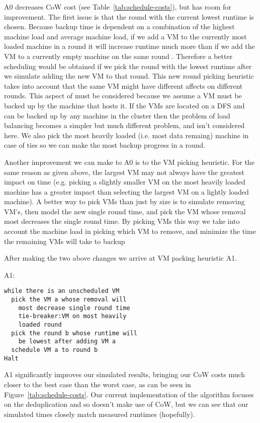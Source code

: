 A0 decreases CoW cost (see Table~\ref{tab:schedule-costs}), but has room for
improvement. The first issue is that the round with the current lowest runtime
is chosen.  Because backup time is dependent on a combination of the highest
machine load and average machine load, if we add a VM to the currently most
loaded machine in a round it will increase runtime much more than if we add the
VM to a currently empty machine on the same round
. Therefore a better scheduling
would be obtained if we pick the round with the lowest runtime after we
simulate adding the new VM to that round. This new round picking heuristic
takes into account that the same VM might have different affects on different
rounds. This aspect of must be considered because we assume a VM must be backed
up by the machine that hosts it. If the VMs are located on a DFS and can be
backed up by any machine in the cluster then the problem of load balancing
becomes a simpler but much different problem, and isn't considered here. We
also pick the most heavily loaded (i.e. most data remaing) machine in case of
ties so we can make the most backup progress in a round.

Another improvement we can make to A0 is to the VM picking heuristic. For the
same reason as given above, the largest VM may not always have the greatest
impact on time (e.g. picking a slightly smaller VM on the most heavily loaded
machine has a greater impact than selecting the largest VM on a lightly loaded
machine). A better way to pick VMs than just by size is to simulate removing
VM's, then model the new single round time, and pick the VM whose removal most
decreases the single round time. By picking VMs this way we take into account
the machine load in picking which VM to remove, and minimize the time the
remaining VMs will take to backup

After making the two above changes we arrive at VM packing heuristic A1.

A1:
\begin{lstlisting}
while there is an unscheduled VM
  pick the VM a whose removal will
    most decrease single round time
    tie-breaker:VM on most heavily
    loaded round
  pick the round b whose runtime will
    be lowest after adding VM a
  schedule VM a to round b
Halt
\end{lstlisting}

A1 significantly improves our simulated results, bringing our CoW costs much
closer to the best case than the worst case, as can be seen in
Figure~\ref{tab:schedule-costs}.  Our current implementation of the algorithm
focuses on the deduplication and so doesn't make use of CoW, but we can see
that our simulated times closely match measured runtimes (hopefully). 
